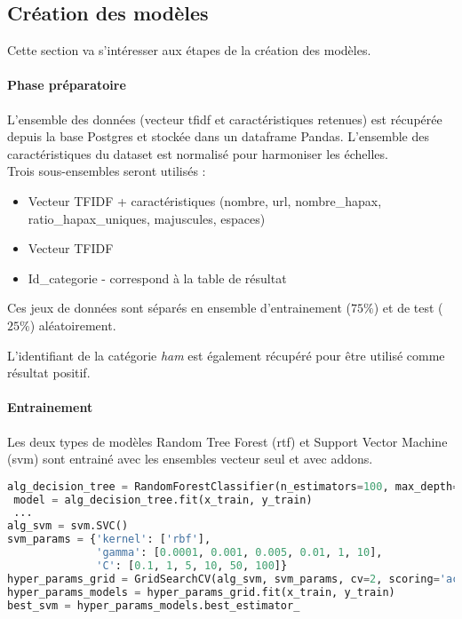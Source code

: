 \subsection{Création des modèles}
    Cette section va s'intéresser aux étapes de la création des modèles.

    \paragraph{Phase préparatoire}
        L'ensemble des données (vecteur tfidf et caractéristiques retenues) est récupérée depuis la base Postgres et stockée dans un dataframe Pandas.
        L'ensemble des caractéristiques du dataset est normalisé pour harmoniser les échelles.\\

        Trois sous-ensembles seront utilisés :
        \begin{itemize}
            \item Vecteur TFIDF + caractéristiques (nombre, url, nombre\_hapax, ratio\_hapax\_uniques, majuscules, espaces)
            \item Vecteur TFIDF
            \item Id\_categorie - correspond à la table de résultat
        \end{itemize}
        Ces jeux de données sont séparés en ensemble d'entrainement ($75\%$) et de test ($25\%$) aléatoirement.

        L'identifiant de la catégorie \emph{ham} est également récupéré pour être utilisé comme résultat positif.
        
    \paragraph{Entrainement}
        Les deux types de modèles Random Tree Forest (rtf) et Support Vector Machine (svm) sont entrainé avec les ensembles vecteur seul et avec addons.
        \begin{lstlisting}[title=Entrainement des modèles, language=Python,label={lst:train}]
alg_decision_tree = RandomForestClassifier(n_estimators=100, max_depth=100, n_jobs=-1)
 model = alg_decision_tree.fit(x_train, y_train)
 ...
alg_svm = svm.SVC()
svm_params = {'kernel': ['rbf'],
              'gamma': [0.0001, 0.001, 0.005, 0.01, 1, 10],
              'C': [0.1, 1, 5, 10, 50, 100]}
hyper_params_grid = GridSearchCV(alg_svm, svm_params, cv=2, scoring='accuracy', n_jobs=-1)
hyper_params_models = hyper_params_grid.fit(x_train, y_train)
best_svm = hyper_params_models.best_estimator_
        \end{lstlisting}

